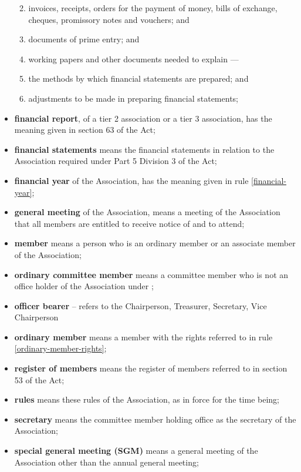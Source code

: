 \documentclass[../constitution.tex]{subfiles}
\begin{document}
\begin{itemize}[label={-}]
  \begin{enumerate}
  \def\labelenumi{\arabic{enumi}.}
  
  \item invoices, receipts, orders for the payment of money, bills of exchange, cheques, promissory notes and vouchers; and
  \item documents of prime entry; and
  \item working papers and other documents needed to explain ---
  \item the methods by which financial statements are prepared; and
  \item adjustments to be made in preparing financial statements;
  \end{enumerate}
\item \textbf{financial report}, of a tier 2 association or a tier 3 association, has the meaning given in section 63 of the Act;
\item \textbf{financial statements} means the financial statements in relation to the Association required under Part 5 Division 3 of the Act;
\item \textbf{financial year} of the Association, has the meaning given in rule \ref{financial-year};
\item \textbf{general meeting} of the Association, means a meeting of the Association that all members are entitled to receive notice of and to attend;
\item \textbf{member} means a person who is an ordinary member or an associate member of the Association;
\item \textbf{ordinary committee member} means a committee member who is not an office holder of the Association under ;
\item \textbf{officer bearer} -- refers to the Chairperson, Treasurer, Secretary, Vice Chairperson
\item \textbf{ordinary member} means a member with the rights referred to in rule \ref{ordinary-member-rights};
\item \textbf{register of members} means the register of members referred to in section 53 of the Act;
\item \textbf{rules} means these rules of the Association, as in force for the time being;
\item \textbf{secretary} means the committee member holding office as the secretary of the Association;
\item \textbf{special general meeting (SGM)} means a general meeting of the Association other than the annual general meeting;

\end{itemize}
\end{document}
